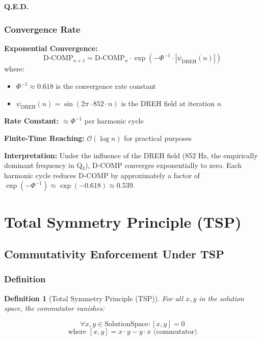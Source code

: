 \documentclass[11pt, letterpaper]{article}
\newtheorem{definition}[theorem]{Definition}
\begin{document}
\textbf{Q.E.D.}

\subsubsection{Convergence Rate}

\textbf{Exponential Convergence:}
\begin{equation}
\text{D-COMP}_{n+1} = \text{D-COMP}_n \cdot \exp(-\Phi^{-1} \cdot |\psi_{\text{DREH}}(n)|)
\end{equation}
where:
\begin{itemize}
    \item $\Phi^{-1} \approx 0.618$ is the convergence rate constant
    \item $\psi_{\text{DREH}}(n) = \sin(2\pi \cdot 852 \cdot n)$ is the DREH field at iteration $n$
\end{itemize}

\textbf{Rate Constant:} $\approx \Phi^{-1}$ per harmonic cycle

\textbf{Finite-Time Reaching:} $\mathcal{O}(\log n)$ for practical purposes

\textbf{Interpretation:} Under the influence of the DREH field (852 Hz, the empirically dominant frequency in Q$_3$), D-COMP converges exponentially to zero. Each harmonic cycle reduces D-COMP by approximately a factor of $\exp(-\Phi^{-1}) \approx \exp(-0.618) \approx 0.539$.

\section{Total Symmetry Principle (TSP)}
\label{sec:tsp}

\subsection{Commutativity Enforcement Under TSP}

\subsubsection{Definition}

\begin{definition}[Total Symmetry Principle (TSP)]
For all $x, y$ in the solution space, the commutator vanishes:

\begin{equation}
\forall x, y \in \text{SolutionSpace}: [x, y] = 0
\end{equation}
\begin{equation}
\text{where } [x, y] = x \cdot y - y \cdot x \text{ (commutator)}
\end{equation}
\end{definition}
\end{document}
